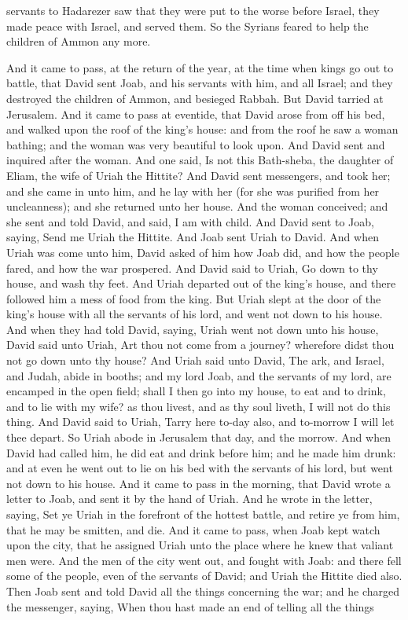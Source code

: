 servants to Hadarezer saw that they were put to the worse before Israel, they made peace with Israel, and served them. So the Syrians feared to help the children of Ammon any more. 

And it came to pass, at the return of the year, at the time when kings go out to battle, that David sent Joab, and his servants with him, and all Israel; and they destroyed the children of Ammon, and besieged Rabbah. But David tarried at Jerusalem.  And it came to pass at eventide, that David arose from off his bed, and walked upon the roof of the king’s house: and from the roof he saw a woman bathing; and the woman was very beautiful to look upon. And David sent and inquired after the woman. And one said, Is not this Bath-sheba, the daughter of Eliam, the wife of Uriah the Hittite? And David sent messengers, and took her; and she came in unto him, and he lay with her (for she was purified from her uncleanness); and she returned unto her house. And the woman conceived; and she sent and told David, and said, I am with child.  And David sent to Joab, saying, Send me Uriah the Hittite. And Joab sent Uriah to David. And when Uriah was come unto him, David asked of him how Joab did, and how the people fared, and how the war prospered. And David said to Uriah, Go down to thy house, and wash thy feet. And Uriah departed out of the king’s house, and there followed him a mess of food from the king. But Uriah slept at the door of the king’s house with all the servants of his lord, and went not down to his house. And when they had told David, saying, Uriah went not down unto his house, David said unto Uriah, Art thou not come from a journey? wherefore didst thou not go down unto thy house? And Uriah said unto David, The ark, and Israel, and Judah, abide in booths; and my lord Joab, and the servants of my lord, are encamped in the open field; shall I then go into my house, to eat and to drink, and to lie with my wife? as thou livest, and as thy soul liveth, I will not do this thing. And David said to Uriah, Tarry here to-day also, and to-morrow I will let thee depart. So Uriah abode in Jerusalem that day, and the morrow. And when David had called him, he did eat and drink before him; and he made him drunk: and at even he went out to lie on his bed with the servants of his lord, but went not down to his house.  And it came to pass in the morning, that David wrote a letter to Joab, and sent it by the hand of Uriah. And he wrote in the letter, saying, Set ye Uriah in the forefront of the hottest battle, and retire ye from him, that he may be smitten, and die. And it came to pass, when Joab kept watch upon the city, that he assigned Uriah unto the place where he knew that valiant men were. And the men of the city went out, and fought with Joab: and there fell some of the people, even of the servants of David; and Uriah the Hittite died also. Then Joab sent and told David all the things concerning the war; and he charged the messenger, saying, When thou hast made an end of telling all the things 